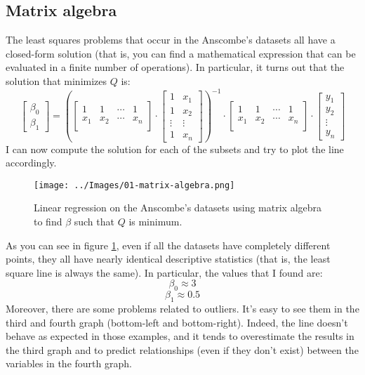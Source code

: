     \subsection{Matrix algebra}
        The least squares problems that occur in the Anscombe's datasets all have a closed-form solution (that is, you can find a mathematical expression that can be evaluated in a finite number of operations). In particular, it turns out that the solution that minimizes \(Q\) is:
        \[
            \begin{bmatrix}
                \beta_0 \\
                \beta_1
            \end{bmatrix}
            = \left(
            \begin{bmatrix}
                1 &     1 &     \cdots &    1 \\
                x_1 &   x_2 &   \cdots &    x_n \\
            \end{bmatrix}
            \cdot
            \begin{bmatrix}
                1 &         x_1 \\
                1 &         x_2 \\
                \vdots &    \vdots \\
                1 &         x_n
            \end{bmatrix}
            \right)^{-1}
            \cdot
            \begin{bmatrix}
                1 &     1 &     \cdots &    1 \\
                x_1 &   x_2 &   \cdots &    x_n \\
            \end{bmatrix}
            \cdot
            \begin{bmatrix}
                y_1 \\
                y_2 \\
                \vdots \\
                y_n
            \end{bmatrix}
        \]
        I can now compute the solution for each of the subsets and try to plot the line accordingly.
        \begin{figure}
            \centering
            \texttt{[image: ../Images/01-matrix-algebra.png]}
            \caption{Linear regression on the Anscombe's datasets using matrix algebra to find \(\beta\) such that \(Q\) is minimum.}
            \label{matrix-algebra}
        \end{figure}
        As you can see in figure \ref{matrix-algebra}, even if all the datasets have completely different points, they all have nearly identical descriptive statistics (that is, the least square line is always the same). In particular, the values that I found are:
        \[\beta_0 \approx 3\]
        \[\beta_1 \approx 0.5\]
        Moreover, there are some problems related to outliers. It's easy to see them in the third and fourth graph (bottom-left and bottom-right). Indeed, the line doesn't behave as expected in those examples, and it tends to overestimate the results in the third graph and to predict relationships (even if they don't exist) between the variables in the fourth graph.

